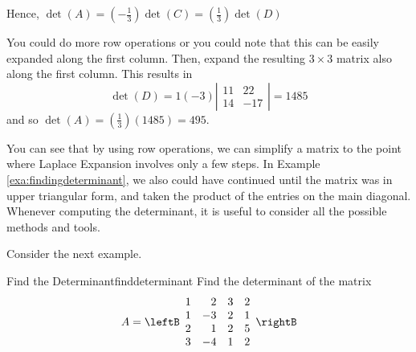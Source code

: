 \begin{solution}
Hence, $\det \left(A\right) = \left(-\frac{1}{3}\right) \det \left( C\right) = \left(\frac{1}{3}\right) \det \left( D\right)$ 

You could do more row operations or you could note that this can be easily
expanded along the first column. Then, expand the resulting $3 \times 3$ matrix
also along the first column. This results in 
\begin{equation*}
\det \left( D\right) =1\left( -3\right) \left\vert
\begin{array}{cc}
11 & 22 \\
14 & -17
\end{array}
\right\vert = 1485
\end{equation*}
and so  $\det \left( A\right) =\left(\frac{1}{3}\right) \left( 1485\right)
=495.$
\end{solution} 

You can see that by using row operations, we can simplify a matrix
to the point where Laplace Expansion involves only a few steps. In Example
\ref{exa:findingdeterminant}, we also could have continued until the matrix was in 
upper triangular form, and taken the product of the entries on the main diagonal. Whenever 
computing the determinant, it is useful to consider all the possible methods and tools.

Consider the next example.

\begin{example}{Find the Determinant}{finddeterminant}
Find the determinant of the matrix
\begin{equation*}
A = \leftB
\begin{array}{rrrr}
1 & 2 & 3 & 2 \\
1 & -3 & 2 & 1 \\
2 & 1 & 2 & 5 \\
3 & -4 & 1 & 2
\end{array}
\rightB
\end{equation*}
\end{example}

